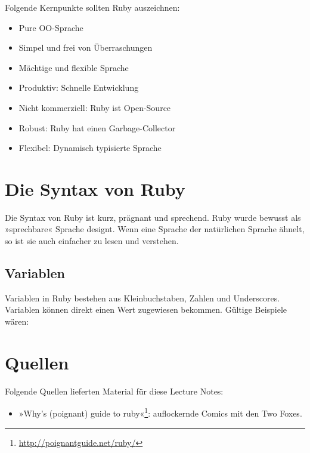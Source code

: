 \documentclass[a4book,11pt,twoside]{scrbook}
\begin{document}
Folgende Kernpunkte sollten Ruby auszeichnen:
\begin{itemize}
	\item Pure OO-Sprache
	\item Simpel und frei von Überraschungen
	\item Mächtige und flexible Sprache
	\item Produktiv: Schnelle Entwicklung
	\item Nicht kommerziell: Ruby ist Open-Source
	\item Robust: Ruby hat einen Garbage-Collector
	\item Flexibel: Dynamisch typisierte Sprache
\end{itemize}







\chapter{Die Syntax von Ruby} %
\label{cha:die_syntax_von_ruby}
Die Syntax von Ruby ist kurz, prägnant und sprechend. Ruby wurde bewusst als »sprechbare« Sprache designt. Wenn eine Sprache der natürlichen Sprache ähnelt, so ist sie auch einfacher zu lesen und verstehen.

\section{Variablen} %
\label{sub:variablen}
Variablen in Ruby bestehen aus Kleinbuchstaben, Zahlen und Underscores. Variablen können direkt einen Wert zugewiesen bekommen. Gültige Beispiele wären:



\chapter*{Quellen} %
\label{cha:quellen}
Folgende Quellen lieferten Material für diese Lecture Notes:

\begin{itemize}
	\item »Why's (poignant) guide to ruby«\footnote{\url{http://poignantguide.net/ruby/}}: auflockernde Comics mit den Two Foxes.
\end{itemize}

%
\end{document}
